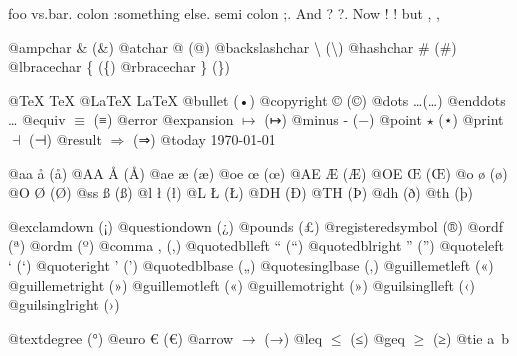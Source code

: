 \documentclass{book}
\renewcommand{\_}{\Texinfounderscore\discretionary{}{}{}}
\begin{document}
foo vs.\@ bar. 
colon :\@And something else.
semi colon ;\@.
And ? ?\@.
Now ! !\@@
but , ,\@

@ampchar \& (\&)
@atchar @ (@)
@backslashchar \textbackslash{} (\textbackslash{})
@hashchar \# (\#)
@lbracechar \{ (\{)
@rbracechar \} (\})

@TeX \TeX{}
@LaTeX \LaTeX{}
@bullet \textbullet{} (•)
@copyright \copyright{} (©)
@dots \dots{}\@ (…)
@enddots \dots{}
@equiv $\equiv{}$ (≡)
@error 
@expansion $\mapsto{}$ (↦)
@minus - (−)
@point $\star{}$ (⋆)
@print $\dashv{}$ (⊣)
@result $\Rightarrow{}$ (⇒)
@today \today{}

@aa \aa{} (å)
@AA \AA{} (Å)
@ae \ae{} (æ)
@oe \oe{} (œ)
@AE \AE{} (Æ)
@OE \OE{} (Œ)
@o \o{} (ø)
@O \O{} (Ø)
@ss \ss{} (ß)
@l \l{} (ł)
@L \L{} (Ł)
@DH \DH{} (Ð)
@TH \TH{} (Þ)
@dh \dh{} (ð)
@th \th{} (þ)

@exclamdown \textexclamdown{} (¡)
@questiondown \textquestiondown{} (¿)
@pounds \textsterling{} (£)
@registeredsymbol \circledR{} (®)
@ordf \textordfeminine{} (ª)
@ordm \textordmasculine{} (º)
@comma , (,)
@quotedblleft \textquotedblleft{} (“)
@quotedblright \textquotedblright{} (”)
@quoteleft \textquoteleft{} (‘)
@quoteright \textquoteright{} (’)
@quotedblbase \quotedblbase{} („)
@quotesinglbase \quotesinglbase{} (‚)
@guillemetleft \guillemotleft{} («)
@guillemetright \guillemotright{} (»)
@guillemotleft \guillemotleft{} («)
@guillemotright \guillemotright{} (»)
@guilsinglleft \guilsinglleft{} (‹)
@guilsinglright \guilsinglright{} (›)

@textdegree \textdegree{} (°)
@euro \euro{} (€)
@arrow $\rightarrow{}$ (→)
@leq $\leq{}$ (≤)
@geq $\geq{}$ (≥)
@tie a~b
\end{document}

